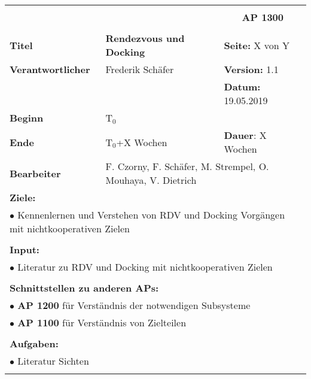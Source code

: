 \clearpage
\begin{table}[!h]
 \begin{center}
  \begin{tabular}{|p{35mm}||p{55mm}|p{50mm}||p{40mm}|}
   \hline
   \multicolumn{3}{|l||}{\textbf{}} & \multicolumn{1}{c|}{}\\
   \multicolumn{3}{|l||}{\textbf{}} & \multicolumn{1}{c|}{\textbf{AP 1300}}\\
   \multicolumn{3}{|l||}{\textbf{}} & \multicolumn{1}{c|}{}\\
   \hline\hline
   \textbf{Titel} & \multicolumn{2}{p{7cm}||}{\textbf{Rendezvous und Docking}} & \textbf{Seite:} X von Y\\
   \hline
   \textbf{Verantwortlicher} & \multicolumn{2}{l||}{Frederik Schäfer} & \textbf{Version:} 1.1\\
   \hline
   \multicolumn{3}{|l||}{} & \textbf{Datum:} 19.05.2019\\
   \hline\hline
   \textbf{Beginn} & \multicolumn{2}{l||}{T$_0$} & \\
   \hline
   \textbf{Ende} & \multicolumn{2}{l||}{T$_0$+X Wochen} & \textbf{Dauer}: X Wochen\\
   \hline\hline
   \textbf{Bearbeiter} & \multicolumn{3}{l|}{F. Czorny, F. Schäfer, M. Strempel, O. Mouhaya, V. Dietrich}\\
   \hline\hline
   \multicolumn{4}{|p{150mm}|}{\textbf{Ziele:}}\\
   \multicolumn{4}{|p{150mm}|}{$\bullet$ Kennenlernen und Verstehen von RDV und Docking Vorgängen mit nichtkooperativen Zielen}\\
   \multicolumn{4}{|p{150mm}|}{}\\
   \multicolumn{4}{|p{150mm}|}{\textbf{Input:}}\\
   \multicolumn{4}{|p{150mm}|}{$\bullet$ Literatur zu RDV und Docking mit nichtkooperativen Zielen}\\
   \multicolumn{4}{|p{150mm}|}{}\\
   \multicolumn{4}{|p{150mm}|}{\textbf{Schnittstellen zu anderen APs:}}\\
   \multicolumn{4}{|p{150mm}|}{$\bullet$ \textbf{AP 1200} für Verständnis der notwendigen Subsysteme}\\
   \multicolumn{4}{|p{150mm}|}{$\bullet$ \textbf{AP 1100} für Verständnis von Zielteilen}\\
   \multicolumn{4}{|p{150mm}|}{}\\
   \multicolumn{4}{|p{150mm}|}{\textbf{Aufgaben:}}\\
   \multicolumn{4}{|p{150mm}|}{$\bullet$ Literatur Sichten}\\
   \multicolumn{4}{|p{150mm}|}{}\\
   \hline
  \end{tabular}
 \end{center}
\end{table}

